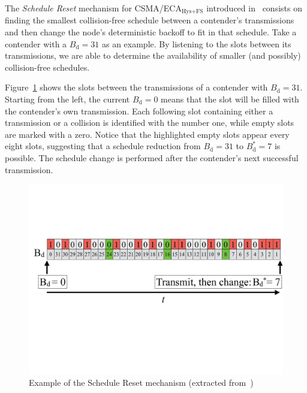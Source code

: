 The \emph{Schedule Reset} mechanism for CSMA/ECA$_{\text{Hys+FS}}$ introduced in~\cite{sanabria2014high} consists on finding the smallest collision-free schedule between a contender's transmissions and then change the node's deterministic backoff to fit in that schedule. Take a contender with a $B_{\text{d}}=31$ as an example. By listening to the slots between its transmissions, we are able to determine the availability of smaller (and possibly) collision-free schedules. 

Figure~\ref{fig:scheduleReset1} shows the slots between the transmissions of a contender with $B_{\text{d}}=31$. Starting from the left, the current $B_{\text{d}}=0$ means that the slot will be filled with the contender's own transmission. Each following slot containing either a transmission or a collision is identified with the number one, while empty slots are marked with a zero. Notice that the highlighted empty slots appear every eight slots, suggesting that a schedule reduction from $B_{\text{d}}=31$ to $B_{\text{d}}^{*}=7$ is possible. The schedule change is performed after the contender's next successful transmission. 



	\begin{figure}[t!]
	\centering
		\includegraphics[width=\linewidth]{figures/scheduleReset.pdf}
		\caption{Example of the Schedule Reset mechanism (extracted from~\cite{sanabria2014high})}
		\label{fig:scheduleReset1}
	\end{figure}

